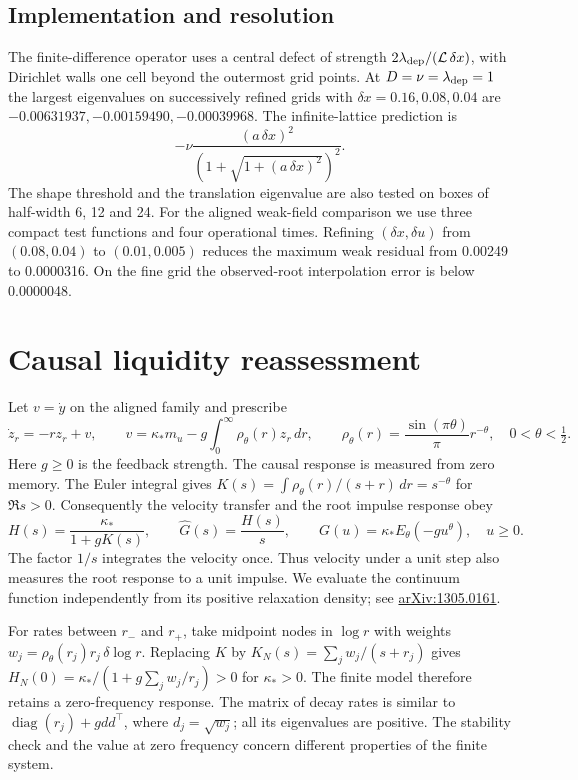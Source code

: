 \documentclass[11pt]{article}
\newcommand{\Liq}{\mathcal L}
\begin{document}
\subsection{Implementation and resolution}
The finite-difference operator uses a central defect of strength
\(2\lambda_{\rm dep}/(\Liq\,\delta x)\), with Dirichlet walls one cell
beyond the outermost grid points. At \(D=\nu=\lambda_{\rm dep}=1\)
the largest eigenvalues on successively refined grids with
\(\delta x=0.16,0.08,0.04\) are \(-0.00631937,-0.00159490,-0.00039968\).
The infinite-lattice prediction is
\[
 -\nu\frac{(a\,\delta x)^2}{(1+\sqrt{1+(a\,\delta x)^2})^2}.
\]
The shape threshold and the translation eigenvalue are also tested on
boxes of half-width 6, 12 and 24. For the aligned weak-field comparison
we use three compact test functions and four operational times.
Refining \((\delta x,\delta u)\) from \((0.08,0.04)\) to \((0.01,0.005)\)
reduces the maximum weak residual from 0.00249 to 0.0000316. On the
fine grid the observed-root interpolation error is below 0.0000048.

\section{Causal liquidity reassessment}
Let \(v=\dot y\) on the aligned family and prescribe
\[
 \dot z_r=-rz_r+v,\qquad v=\kappa_*m_u-g\int_0^\infty \rho_\theta(r)z_r\,dr,
 \qquad \rho_\theta(r)=\frac{\sin(\pi\theta)}{\pi}r^{-\theta},
 \quad 0<\theta<\tfrac12 .
\]
Here \(g\ge0\) is the feedback strength. The causal response is measured
from zero memory. The Euler integral gives
\(K(s)=\int\rho_\theta(r)/(s+r)\,dr=s^{-\theta}\) for \(\Re s>0\).
Consequently the velocity transfer and the root impulse response obey
\begin{equation}
 H(s)=\frac{\kappa_*}{1+gK(s)},\qquad
 \widehat G(s)=\frac{H(s)}{s},\qquad
 G(u)=\kappa_* E_\theta(-gu^\theta),\quad u\ge0 .
 \label{eq:feedback}
\end{equation}
The factor \(1/s\) integrates the velocity once. Thus velocity under a
unit step also measures the root response to a unit impulse. We evaluate
the continuum function independently from its positive relaxation density;
see \href{https://arxiv.org/abs/1305.0161}{arXiv:1305.0161}.

For rates between \(r_-\) and \(r_+\), take midpoint nodes in \(\log r\)
with weights \(w_j=\rho_\theta(r_j)r_j\,\delta\log r\).
Replacing \(K\) by \(K_N(s)=\sum_jw_j/(s+r_j)\) gives
\(H_N(0)=\kappa_* /(1+g\sum_j w_j/r_j)>0\) for \(\kappa_*>0\).
The finite model therefore retains a zero-frequency response. The matrix
of decay rates is similar to \(\operatorname{diag}(r_j)+g dd^\top\),
where \(d_j=\sqrt{w_j}\); all its eigenvalues are positive.
The stability check and the value at zero frequency concern different
properties of the finite system.
\end{document}
